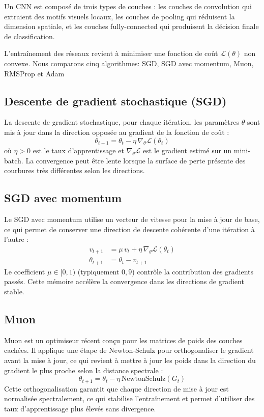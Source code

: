 \documentclass[12pt]{article}
\begin{document}
Un CNN est composé de trois types de couches : les couches de convolution
qui extraient des motifs visuels locaux, les couches de pooling qui réduisent
la dimension spatiale, et les couches fully-connected qui produisent la
décision finale de classification.

L'entraînement des réseaux revient à minimiser une fonction de coût
$\mathcal{L}(\theta)$ non convexe.
Nous comparons cinq algorithmes: SGD, SGD avec momentum, Muon, RMSProp et Adam 

\subsection{Descente de gradient stochastique (SGD)}

La descente de gradient stochastique, pour chaque itération, les paramètres $\theta$ sont mis à jour dans la direction opposée au gradient de la fonction de coût :
\begin{equation}
  \theta_{t+1} = \theta_t - \eta \, \nabla_\theta \mathcal{L}(\theta_t)
\end{equation}
où $\eta > 0$ est le taux d'apprentissage et $\nabla_\theta \mathcal{L}$ est le gradient estimé sur un mini-batch. La convergence peut être lente lorsque la surface de perte présente des courbures très différentes selon les directions.

\subsection{SGD avec momentum}

Le SGD avec momentum utilise un vecteur de vitesse pour la mise à jour de base, ce qui permet de conserver une direction de descente cohérente d'une itération à l'autre :
\begin{align}
  v_{t+1} &= \mu \, v_t + \eta \, \nabla_\theta \mathcal{L}(\theta_t) \\
  \theta_{t+1} &= \theta_t - v_{t+1}
\end{align}
Le coefficient $\mu \in [0,1)$ (typiquement $0{,}9$) contrôle la contribution des gradients passés. Cette mémoire accélère la convergence dans les directions de gradient stable.


\subsection{Muon}
Muon \cite{jordan2024muon} est un optimiseur récent conçu pour les matrices de poids des couches cachées. Il applique une étape de Newton-Schulz pour orthogonaliser le gradient avant la mise à jour, ce qui revient à mettre à jour les poids dans la direction du gradient le plus proche selon la distance spectrale :
\begin{equation}
  \theta_{t+1} = \theta_t - \eta \, \text{NewtonSchulz}(G_t)
\end{equation}
Cette orthogonalisation garantit que chaque direction de mise à jour est normalisée spectralement, ce qui stabilise l'entraînement et permet d'utiliser des taux d'apprentissage plus élevés sans divergence.
\end{document}
